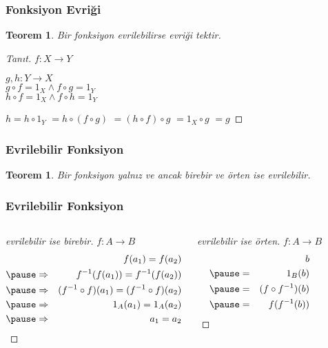 \documentclass[dvipsnames]{beamer}
\theoremstyle{definition}
\theoremstyle{example}
\theoremstyle{plain}
\newtheorem{teorem}[theorem]{Teorem}
\begin{document}
\begin{frame}
  \frametitle{Fonksiyon Evriği}

  \begin{teorem}
    Bir fonksiyon evrilebilirse evriği tektir.
  \end{teorem}

  \pause
  \begin{proof}[Tanıt]
    $f: X \rightarrow Y$

    \pause
    \medskip
    $g,h: Y \rightarrow X$\\
    $g \circ f = 1_X \wedge f \circ g = 1_Y$\\
    $h \circ f = 1_X \wedge f \circ h = 1_Y$

    \pause
    \medskip
    $h = h \circ 1_Y$
    \pause
    $ = h \circ (f \circ g)$
    \pause
    $ = (h \circ f) \circ g$
    \pause
    $ = 1_X \circ g$
    \pause
    $ = g$
  \end{proof}
\end{frame}

\begin{frame}
  \frametitle{Evrilebilir Fonksiyon}

  \begin{teorem}
    Bir fonksiyon yalnız ve ancak birebir ve örten ise evrilebilir.
  \end{teorem}
\end{frame}

\begin{frame}
  \frametitle{Evrilebilir Fonksiyon}

  \begin{columns}[t]
    \begin{proof}[evrilebilir ise birebir]
      $f: A \rightarrow B$
      \begin{eqnarray*}
        &             & f(a_1) = f(a_2)\\\pause
        & \Rightarrow & f^{-1}(f(a_1)) = f^{-1}(f(a_2))\\\pause
        & \Rightarrow & (f^{-1} \circ f) (a_1) = (f^{-1} \circ f) (a_2)\\\pause
        & \Rightarrow & 1_A (a_1) = 1_A (a_2)\\\pause
        & \Rightarrow & a_1 = a_2
      \end{eqnarray*}
    \end{proof}

    \pause
    \begin{proof}[evrilebilir ise örten]
      $f: A \rightarrow B$
      \begin{eqnarray*}
        &   & b\\\pause
        & = & 1_B (b)\\\pause
        & = & (f \circ f^{-1}) (b)\\\pause
        & = & f(f^{-1} (b))
      \end{eqnarray*}
    \end{proof}
  \end{columns}
\end{frame}
\end{document}

